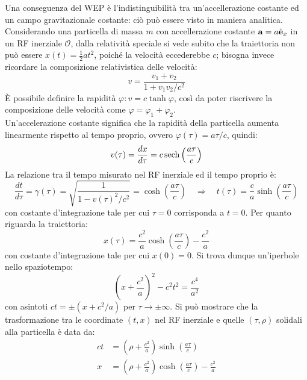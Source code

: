 Una conseguenza del WEP è l'indistinguibilità tra un'accellerazione costante ed un campo gravitazionale costante: ciò può essere visto in maniera analitica.\\
Considerando una particella di massa $ m $ con accellerazione costante $ \mathbf{a} = a \hat{\mathbf{e}}_x $ in un RF inerziale $ \mathcal{O} $, dalla relatività speciale si vede subito che la traiettoria non può essere $ x(t) = \frac{1}{2} at^2 $, poiché la velocità eccederebbe $ c $; bisogna invece ricordare la composizione relativistica delle velocità:
\begin{equation}
  v = \frac{v_1 + v_2}{1 + v_1 v_2 / c^2}
  \label{eq:1.31}
\end{equation}
È possibile definire la rapidità $ \varphi : v = c \tanh\varphi $, così da poter riscrivere la composizione delle velocità come $ \varphi = \varphi_1 + \varphi_2 $.\\
Un'accelerazione costante significa che la rapidità della particella aumenta linearmente rispetto al tempo proprio, ovvero $ \varphi(\tau) = a\tau/c $, quindi:
\begin{equation}
  v(\tau) = \frac{dx}{d\tau} = c \operatorname{sech} \left( \frac{a\tau}{c} \right)
  \label{eq:1.32}
\end{equation}
La relazione tra il tempo misurato nel RF inerziale ed il tempo proprio è:
\begin{equation}
  \frac{dt}{d\tau} = \gamma(\tau) = \sqrt{\frac{1}{1 - v(\tau)^2 / c^2}} = \cosh \left( \frac{a\tau}{c} \right) \quad\Longrightarrow\quad t(\tau) = \frac{c}{a} \sinh \left( \frac{a\tau}{c} \right)
  \label{eq:1.33}
\end{equation}
con costante d'integrazione tale per cui $ \tau = 0 $ corrisponda a $ t = 0 $. Per quanto riguarda la traiettoria:
\begin{equation}
  x(\tau) = \frac{c^2}{a} \cosh \left( \frac{a\tau}{c} \right) - \frac{c^2}{a}
  \label{eq:1.34}
\end{equation}
con costante d'integrazione tale per cui $ x(0) = 0 $. Si trova dunque un'iperbole nello spaziotempo:
\begin{equation}
  \left( x + \frac{c^2}{a} \right)^2 - c^2 t^2 = \frac{c^4}{a^2}
  \label{eq:1.35}
\end{equation}
con asintoti $ ct = \pm \left( x + c^2 / a \right) $ per $ \tau \rightarrow \pm\infty $. Si può mostrare che la trasformazione tra le coordinate $ (t,x) $ nel RF inerziale e quelle $ (\tau,\rho) $ solidali alla particella è data da:
\begin{equation}
  \begin{split}
    ct &= \left( \rho + \frac{c^2}{a} \right) \sinh \left( \frac{a\tau}{c} \right) \\
    x &= \left( \rho + \frac{c^2}{a} \right) \cosh \left( \frac{a\tau}{c} \right) - \frac{c^2}{a}
  \end{split}
  \label{eq:1.36}
\end{equation}
